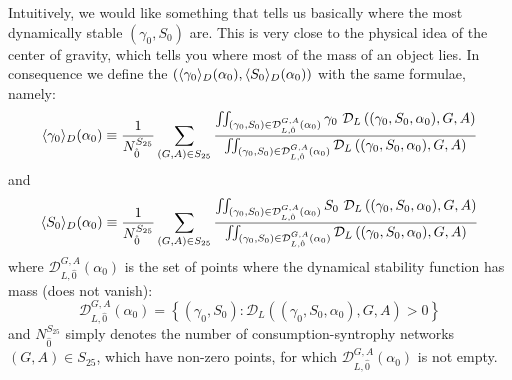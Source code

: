 \documentclass[12pt]{report}
\begin{document}
Intuitively, we would like something that tells us basically where  the most dynamically stable $(\gamma_0, S_0)$ are. This is very close to the physical idea of the center of gravity, which tells you where most of the mass of an object lies. In consequence we define the  $(\langle \gamma_0 \rangle_D(\alpha_0), \langle S_0 \rangle_D(\alpha_0))$ with the same formulae, namely:
\begin{equation}
\av{\gamma_0}_D(\alpha_0) \defined \frac{1}{N_{\hat{0}}^{S_{25}}}\sum_{(G,A) \in S_{25}} \frac{\iint_{(\gamma_0, S_0) \in \mathcal{D}_{L, \hat{0}}^{G,A}\left(\alpha_0\right)}  \gamma_0 \ \mathcal{D}_{L}\left((\gamma_0, S_0, \alpha_0), G, A\right)}{\iint_{(\gamma_0, S_0) \in \mathcal{D}_{L, \hat{0}}^{G,A}\left(\alpha_0\right)} \mathcal{D}_{L}\left((\gamma_0, S_0, \alpha_0), G, A\right) }
\end{equation}
and
\begin{equation}
\av{S_0}_D(\alpha_0) \defined \frac{1}{N_{\hat{0}}^{S_{25}}}\sum_{(G,A) \in S_{25}} \frac{\iint_{(\gamma_0, S_0) \in \mathcal{D}_{L, \hat{0}}^{G,A}\left(\alpha_0\right)}  S_0 \ \mathcal{D}_{L}\left((\gamma_0, S_0, \alpha_0), G, A\right)}{\iint_{(\gamma_0, S_0) \in \mathcal{D}_{L, \hat{0}}^{G,A}\left(\alpha_0\right)} \mathcal{D}_{L}\left((\gamma_0, S_0, \alpha_0), G, A\right) }
\end{equation}
where $\mathcal{D}_{L, \hat{0}}^{G,A}\left(\alpha_0\right)$ is the set of points where the dynamical stability function has mass (\ie does not vanish):
\begin{equation}
\mathcal{D}_{L, \hat{0}}^{G,A}\left(\alpha_0\right) = \left\{(\gamma_0, S_0):\mathcal{D}_L\left((\gamma_0, S_0, \alpha_0), G, A\right) > 0\right\}
\end{equation}
and $N_{\hat{0}}^{S_{25}}$ simply denotes the number of consumption-syntrophy networks $(G,A) \in S_{25}$, which have non-zero points, \ie for which $\mathcal{D}_{L, \hat{0}}^{G,A}\left(\alpha_0\right)$ is not empty.
\end{document}
